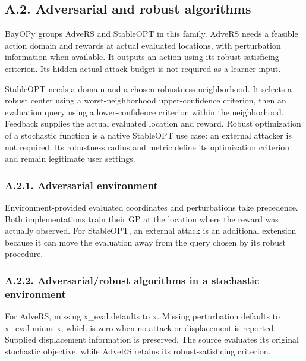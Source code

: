 \documentclass[10pt,a4paper]{article}
\begin{document}
\subsection*{A.2. Adversarial and robust algorithms}

BayOPy groups AdveRS and StableOPT in this family. AdveRS needs a feasible action domain and rewards at actual evaluated locations,\allowbreak{} with perturbation information when available. It outputs an action using its robust-satisficing criterion. Its hidden actual attack budget is not required as a learner input.


StableOPT needs a domain and a chosen robustness neighborhood. It selects a robust center using a worst-neighborhood upper-confidence criterion,\allowbreak{} then an evaluation query using a lower-confidence criterion within the neighborhood. Feedback supplies the actual evaluated location and reward. Robust optimization of a stochastic function is a native StableOPT use case: an external attacker is not required. Its robustness radius and metric define its optimization criterion and remain legitimate user settings.


\subsubsection*{A.2.1. Adversarial environment}

Environment-provided evaluated coordinates and perturbations take precedence. Both implementations train their GP at the location where the reward was actually observed. For StableOPT,\allowbreak{} an external attack is an additional extension because it can move the evaluation away from the query chosen by its robust procedure.


\subsubsection*{A.2.2. Adversarial/robust algorithms in a stochastic environment}

For AdveRS,\allowbreak{} missing x\_\allowbreak{}eval defaults to x. Missing perturbation defaults to x\_\allowbreak{}eval minus x,\allowbreak{} which is zero when no attack or displacement is reported. Supplied displacement information is preserved. The source evaluates its original stochastic objective,\allowbreak{} while AdveRS retains its robust-satisficing criterion.
\end{document}
